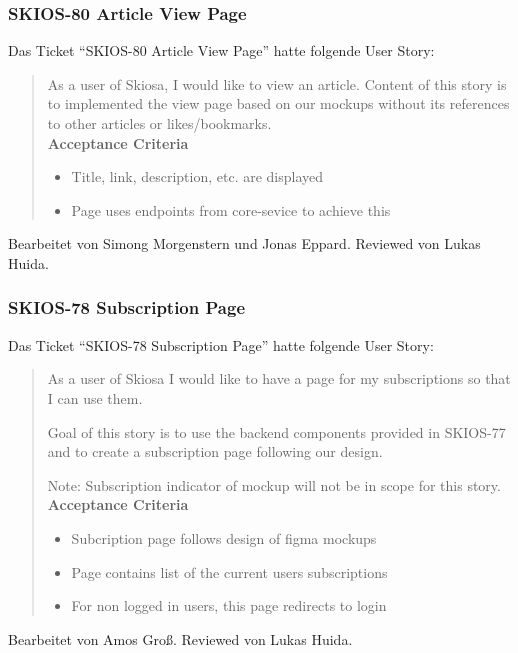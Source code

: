 \subsubsection{SKIOS-80 Article View Page}
Das Ticket \enquote{SKIOS-80 Article View Page} hatte folgende User Story:
\begin{quotation}
    As a user of Skiosa, I would like to view an article.
    Content of this story is to implemented the view page based on our mockups without its references to other articles or likes/bookmarks. \\
\textbf{Acceptance Criteria}
\begin{itemize}
    \item Title, link, description, etc. are displayed 
    \item Page uses endpoints from core-sevice to achieve this
\end{itemize}
\end{quotation}
Bearbeitet von Simong Morgenstern und Jonas Eppard.
Reviewed von Lukas Huida.

\subsubsection{SKIOS-78 Subscription Page}
Das Ticket \enquote{SKIOS-78 Subscription Page} hatte folgende User Story:
\begin{quotation}
    As a user of Skiosa I would like to have a page for my subscriptions so that I can use them.

    Goal of this story is to use the backend components provided in SKIOS-77 and to create a subscription page following our design.

    Note: Subscription indicator of mockup will not be in scope for this story.
\textbf{Acceptance Criteria}
\begin{itemize}
    \item Subcription page follows design of figma mockups
    \item Page contains list of the current users subscriptions
    \item For non logged in users, this page redirects to login
\end{itemize}
\end{quotation}
Bearbeitet von Amos Groß.
Reviewed von Lukas Huida.


